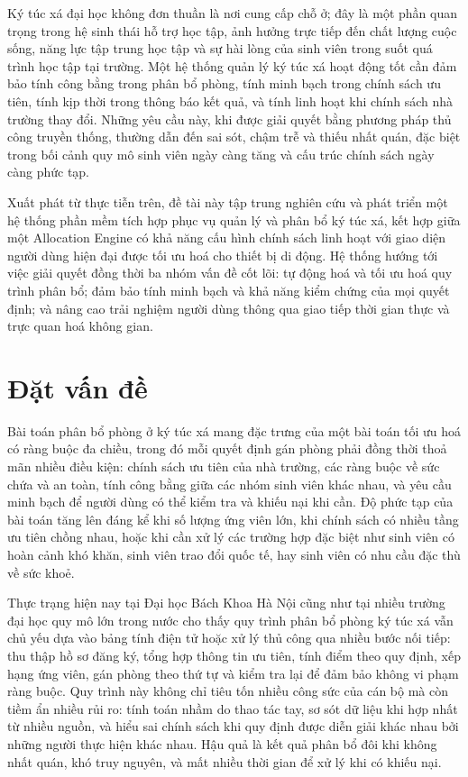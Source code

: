 ﻿\documentclass[a4paper,12pt,openany,oneside]{report}
\begin{document}
Ký túc xá đại học không đơn thuần là nơi cung cấp chỗ ở; đây là một phần quan
trọng trong hệ sinh thái hỗ trợ học tập, ảnh hưởng trực tiếp đến chất lượng
cuộc sống, năng lực tập trung học tập và sự hài lòng của sinh viên trong suốt
quá trình học tập tại trường. Một hệ thống quản lý ký túc xá hoạt động tốt cần
đảm bảo tính công bằng trong phân bổ phòng, tính minh bạch trong chính sách ưu
tiên, tính kịp thời trong thông báo kết quả, và tính linh hoạt khi chính sách
nhà trường thay đổi. Những yêu cầu này, khi được giải quyết bằng phương pháp
thủ công truyền thống, thường dẫn đến sai sót, chậm trễ và thiếu nhất quán,
đặc biệt trong bối cảnh quy mô sinh viên ngày càng tăng và cấu trúc chính sách
ngày càng phức tạp.

Xuất phát từ thực tiễn trên, đề tài này tập trung nghiên cứu và phát triển một
hệ thống phần mềm tích hợp phục vụ quản lý và phân bổ ký túc xá, kết hợp giữa
một Allocation Engine có khả năng cấu hình chính sách linh hoạt với giao diện
người dùng hiện đại được tối ưu hoá cho thiết bị di động. Hệ thống hướng tới
việc giải quyết đồng thời ba nhóm vấn đề cốt lõi: tự động hoá và tối ưu hoá
quy trình phân bổ; đảm bảo tính minh bạch và khả năng kiểm chứng của mọi quyết
định; và nâng cao trải nghiệm người dùng thông qua giao tiếp thời gian thực và
trực quan hoá không gian.

\section{Đặt vấn đề}

Bài toán phân bổ phòng ở ký túc xá mang đặc trưng của một bài toán tối ưu hoá
có ràng buộc đa chiều, trong đó mỗi quyết định gán phòng phải đồng thời thoả
mãn nhiều điều kiện: chính sách ưu tiên của nhà trường, các ràng buộc về sức
chứa và an toàn, tính công bằng giữa các nhóm sinh viên khác nhau, và yêu cầu
minh bạch để người dùng có thể kiểm tra và khiếu nại khi cần. Độ phức tạp của
bài toán tăng lên đáng kể khi số lượng ứng viên lớn, khi chính sách có nhiều
tầng ưu tiên chồng nhau, hoặc khi cần xử lý các trường hợp đặc biệt như sinh
viên có hoàn cảnh khó khăn, sinh viên trao đổi quốc tế, hay sinh viên có nhu
cầu đặc thù về sức khoẻ.

Thực trạng hiện nay tại Đại học Bách Khoa Hà Nội cũng như tại nhiều trường đại
học quy mô lớn trong nước cho thấy quy trình phân bổ phòng ký túc xá vẫn chủ
yếu dựa vào bảng tính điện tử hoặc xử lý thủ công qua nhiều bước nối tiếp: thu
thập hồ sơ đăng ký, tổng hợp thông tin ưu tiên, tính điểm theo quy định, xếp
hạng ứng viên, gán phòng theo thứ tự và kiểm tra lại để đảm bảo không vi phạm
ràng buộc. Quy trình này không chỉ tiêu tốn nhiều công sức của cán bộ mà còn
tiềm ẩn nhiều rủi ro: tính toán nhầm do thao tác tay, sơ sót dữ liệu khi hợp
nhất từ nhiều nguồn, và hiểu sai chính sách khi quy định được diễn giải khác
nhau bởi những người thực hiện khác nhau. Hậu quả là kết quả phân bổ đôi khi
không nhất quán, khó truy nguyên, và mất nhiều thời gian để xử lý khi có khiếu
nại.
\end{document}

